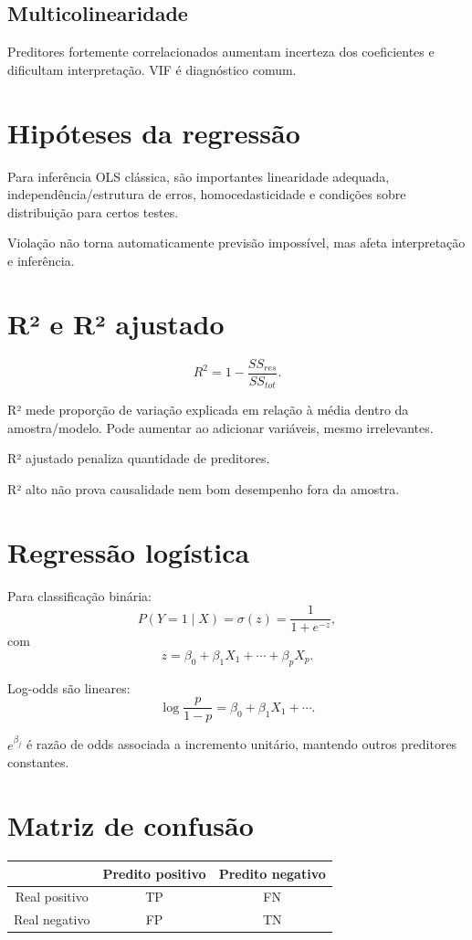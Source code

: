 \subsection{Multicolinearidade}

Preditores fortemente correlacionados aumentam incerteza dos coeficientes e dificultam interpretação. VIF é diagnóstico comum.

\section{Hipóteses da regressão}

Para inferência OLS clássica, são importantes linearidade adequada, independência/estrutura de erros, homocedasticidade e condições sobre distribuição para certos testes.

Violação não torna automaticamente previsão impossível, mas afeta interpretação e inferência.

\section{R² e R² ajustado}

\[
R^2=1-\frac{SS_{res}}{SS_{tot}}.
\]

R² mede proporção de variação explicada em relação à média dentro da amostra/modelo. Pode aumentar ao adicionar variáveis, mesmo irrelevantes.

R² ajustado penaliza quantidade de preditores.

R² alto não prova causalidade nem bom desempenho fora da amostra.

\section{Regressão logística}

Para classificação binária:
\[
P(Y=1\mid X)=\sigma(z)=\frac{1}{1+e^{-z}},
\]
com
\[
z=\beta_0+\beta_1X_1+\cdots+\beta_pX_p.
\]

Log-odds são lineares:
\[
\log\frac{p}{1-p}=\beta_0+\beta_1X_1+\cdots.
\]

$e^{\beta_j}$ é razão de odds associada a incremento unitário, mantendo outros preditores constantes.

\section{Matriz de confusão}

\begin{center}
\begin{tabular}{c|cc}
 & Predito positivo & Predito negativo\\\hline
Real positivo & TP & FN\\
Real negativo & FP & TN
\end{tabular}
\end{center}

